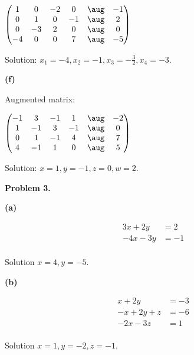 \documentclass[oneside,12pt]{amsart}
\begin{document}
\bigskip

$
\begin{pmatrix}
   1  &  0   & -2  &  0 & \aug  & -1  \\
   0  &  1   &  0  & -1 & \aug  & 2   \\
   0  & -3   &  2  &  0 & \aug  & 0   \\
  -4   & 0   &  0  &  7 & \aug  & -5  \\
\end{pmatrix}
$

\bigskip

Solution: $x_1=-4, x_2=-1, x_3 = -\frac{3}{2}, x_4=-3$.


\bigskip

\textbf{(f)}

Augmented matrix:

\bigskip

$
\begin{pmatrix}
  -1  &  3   & -1  &  1 & \aug  & -2  \\
   1  & -1   &  3  & -1 & \aug  &  0  \\
   0  &  1   & -1  &  4 & \aug  &  7  \\
   4  & -1   &  1  &  0 & \aug  &  5  \\
\end{pmatrix}
$

\bigskip

Solution: $x=1, y=-1, z=0, w=2$.

\bigskip

\textbf{Problem 3.}

\bigskip


\textbf{(a)}

\begin{align*}
3x + 2y   &= 2 \\
-4x -3y &= -1 \\
\end{align*}

Solution $x=4, y=-5$.

\bigskip


\textbf{(b)}

\begin{align*}
  x + 2y       &= -3 \\
 -x + 2y +  z  &= -6 \\
-2x     - 3z  &=  1 \\
\end{align*}

Solution $x=1, y=-2, z=-1$.
\end{document}
